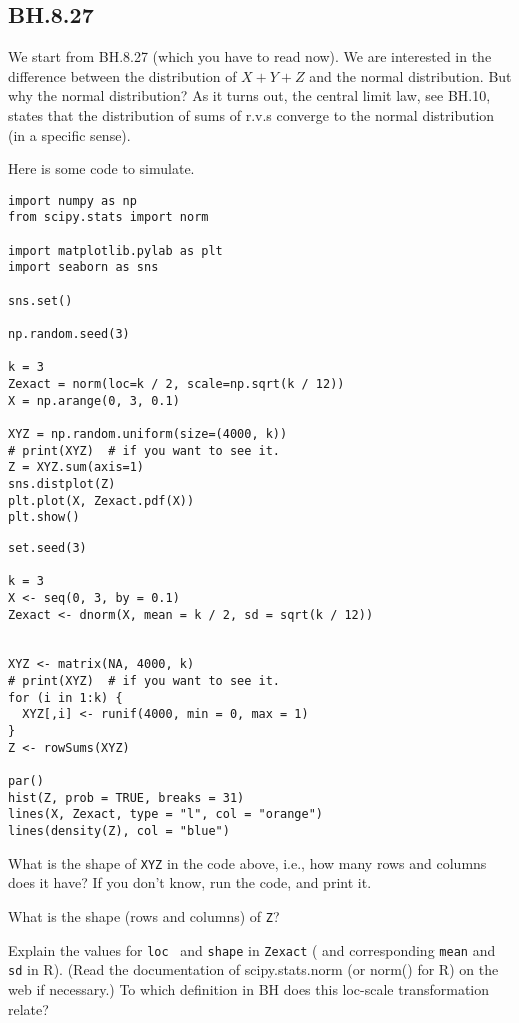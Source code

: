 \subsection{BH.8.27}

We start from BH.8.27 (which you have to read now).  We are interested in the difference between the distribution of $X+Y+Z$ and the normal distribution. But why the normal distribution? As it turns out, the central limit law, see BH.10, states that the distribution of sums of r.v.s converge to the normal distribution (in a specific sense).

Here is some code to simulate.

\begin{verbatim}
import numpy as np
from scipy.stats import norm

import matplotlib.pylab as plt
import seaborn as sns

sns.set()

np.random.seed(3)

k = 3
Zexact = norm(loc=k / 2, scale=np.sqrt(k / 12))
X = np.arange(0, 3, 0.1)

XYZ = np.random.uniform(size=(4000, k))
# print(XYZ)  # if you want to see it.
Z = XYZ.sum(axis=1)
sns.distplot(Z)
plt.plot(X, Zexact.pdf(X))
plt.show()
\end{verbatim}

\begin{verbatim}
set.seed(3)

k = 3
X <- seq(0, 3, by = 0.1)
Zexact <- dnorm(X, mean = k / 2, sd = sqrt(k / 12))


XYZ <- matrix(NA, 4000, k)
# print(XYZ)  # if you want to see it.
for (i in 1:k) {
  XYZ[,i] <- runif(4000, min = 0, max = 1)
}
Z <- rowSums(XYZ)

par()
hist(Z, prob = TRUE, breaks = 31)
lines(X, Zexact, type = "l", col = "orange")
lines(density(Z), col = "blue")
\end{verbatim}


\begin{exercise}
What is the shape of \verb|XYZ| in the code above, i.e., how many rows and columns does it have? If you don't know, run the code, and print it.
\end{exercise}

\begin{exercise}
What is the shape (rows and columns) of \verb|Z|?
\end{exercise}

\begin{exercise}
Explain the values for \verb|loc|~ and \verb|shape| in \verb|Zexact| ( and corresponding \verb|mean| and \verb|sd| in R).
  (Read the documentation of scipy.stats.norm (or norm() for R) on the web if necessary.)
  To which definition in BH does this loc-scale transformation relate?
\end{exercise}


